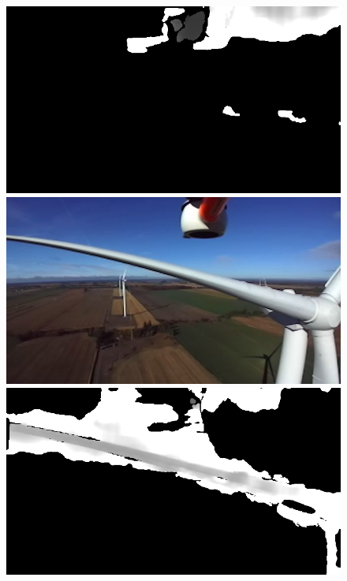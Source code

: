 \begin{figure}[htp]
\begin{minipage}{0.49\textwidth}
  \end{minipage}
  \begin{minipage}{0.49\textwidth}
    \centering
    \includegraphics[width=\linewidth]{images/field_stereo_fail_pcl2.png}
  \end{minipage}
  \begin{minipage}{0.49\textwidth}
    \centering
    \includegraphics[width=\linewidth]{images/field_stereo_success_rgb.png}
  \end{minipage}
  \begin{minipage}{0.49\textwidth}
    \centering
    \includegraphics[width=\linewidth]{images/field_stereo_success_pcl.png}

\end{minipage}
\end{figure}

